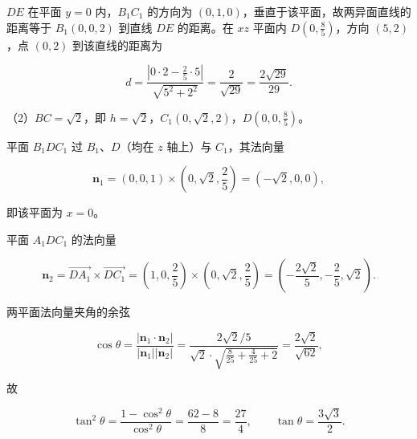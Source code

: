 \begin{answer}
$DE$ 在平面 $y=0$ 内，$B_1C_1$ 的方向为 $(0,1,0)$，垂直于该平面，故两异面直线的距离等于 $B_1(0,0,2)$ 到直线 $DE$ 的距离。在 $xz$ 平面内 $D(0,\frac85)$，方向 $(5,2)$，点 $(0,2)$ 到该直线的距离为

\nopagebreak[4]
\[d=\frac{\left|0\cdot2-\frac25\cdot5\right|}{\sqrt{5^2+2^2}}=\frac2{\sqrt{29}}=\frac{2\sqrt{29}}{29}.\]

（2）$BC=\sqrt2$，即 $h=\sqrt2$，$C_1(0,\sqrt2,2)$，$D\left(0,0,\frac85\right)$。

平面 $B_1DC_1$ 过 $B_1$、$D$（均在 $z$ 轴上）与 $C_1$，其法向量

\nopagebreak[4]
\[\boldsymbol n_1=(0,0,1)\times\left(0,\sqrt2,\frac25\right)=\left(-\sqrt2,0,0\right),\]

即该平面为 $x=0$。

平面 $A_1DC_1$ 的法向量

\nopagebreak[4]
\[\boldsymbol n_2=\overrightarrow{DA_1}\times\overrightarrow{DC_1}=\left(1,0,\frac25\right)\times\left(0,\sqrt2,\frac25\right)
=\left(-\frac{2\sqrt2}5,-\frac25,\sqrt2\right).\]

两平面法向量夹角的余弦

\nopagebreak[4]
\[\cos\theta=\frac{\left|\boldsymbol n_1\cdot\boldsymbol n_2\right|}{\left|\boldsymbol n_1\right|\left|\boldsymbol n_2\right|}
=\frac{2\sqrt2/5}{\sqrt2\cdot\sqrt{\frac8{25}+\frac4{25}+2}}
=\frac{2\sqrt2}{\sqrt{62}},\]

故

\nopagebreak[4]
\[\tan^2\theta=\frac{1-\cos^2\theta}{\cos^2\theta}=\frac{62-8}8=\frac{27}4,\qquad \tan\theta=\frac{3\sqrt3}2.\]


\end{answer}
